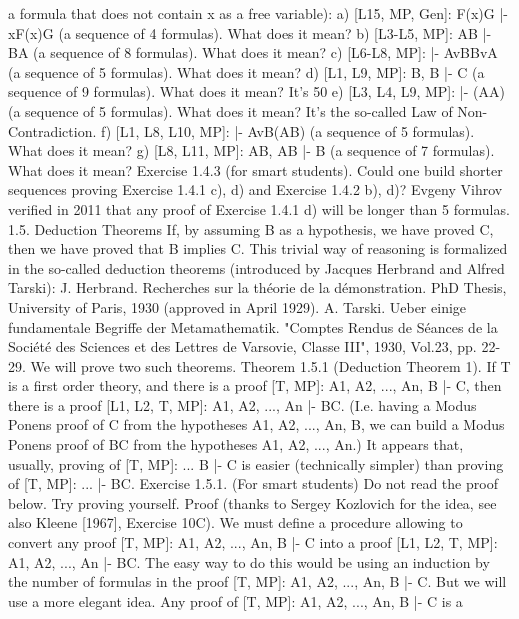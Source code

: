 a formula that does not contain x as a free variable):
a) [L15, MP, Gen]: F(x)\IMPLIES G |- \exists xF(x)\IMPLIES G (a sequence of 4 formulas). What does it mean?
b) [L3-L5, MP]: A\AND B |- B\AND A (a sequence of 8 formulas). What does it mean?
c) [L6-L8, MP]: |- AvB\IMPLIES BvA (a sequence of 5 formulas). What does it mean?
d) [L1, L9, MP]: B, \neg B |- \neg C (a sequence of 9 formulas). What does it mean? It's 50%
e) [L3, L4, L9, MP]: |- \neg (A\AND \neg A) (a sequence of 5 formulas). What does it mean? It's the so-called Law of
Non-Contradiction.
f) [L1, L8, L10, MP]: |- \neg AvB\IMPLIES (A\IMPLIES B) (a sequence of 5 formulas). What does it mean?
g) [L8, L11, MP]: A\IMPLIES B, \neg A\IMPLIES B |- B (a sequence of 7 formulas). What does it mean?
Exercise 1.4.3 (for smart students). Could one build shorter sequences proving Exercise 1.4.1 c), d) and
Exercise 1.4.2 b), d)? Evgeny Vihrov verified in 2011 that any proof of Exercise 1.4.1 d) will be longer
than 5 formulas.
1.5. Deduction Theorems
If, by assuming B as a hypothesis, we have proved C, then we have proved that B implies C. This trivial
way of reasoning is formalized in the so-called deduction theorems (introduced by Jacques Herbrand
and Alfred Tarski):
J. Herbrand. Recherches sur la théorie de la démonstration. PhD Thesis, University of Paris, 1930 (approved in April 1929).
A. Tarski. Ueber einige fundamentale Begriffe der Metamathematik. "Comptes Rendus de Séances de la Société des Sciences
et des Lettres de Varsovie, Classe III", 1930, Vol.23, pp. 22-29.
We will prove two such theorems.
Theorem 1.5.1 (Deduction Theorem 1). If T is a first order theory, and there is a proof [T, MP]: A1,
A2, ..., An, B |- C, then there is a proof [L1, L2, T, MP]: A1, A2, ..., An |- B\IMPLIES C. (I.e. having a Modus
Ponens proof of C from the hypotheses A1, A2, ..., An, B, we can build a Modus Ponens proof of B\IMPLIES C
from the hypotheses A1, A2, ..., An.)
It appears that, usually, proving of [T, MP]: ... B |- C is easier (technically simpler) than proving of [T,
MP]: ... |- B\IMPLIES C.
Exercise 1.5.1. (For smart students) Do not read the proof below. Try proving yourself.
Proof (thanks to Sergey Kozlovich for the idea, see also Kleene [1967], Exercise 10C). We must define a
procedure allowing to convert any proof [T, MP]: A1, A2, ..., An, B |- C into a proof [L1, L2, T, MP]: A1,
A2, ..., An |- B\IMPLIES C.
The easy way to do this would be using an induction by the number of formulas in the proof [T, MP]: A1,
A2, ..., An, B |- C. But we will use a more elegant idea. Any proof of [T, MP]: A1, A2, ..., An, B |- C is a
